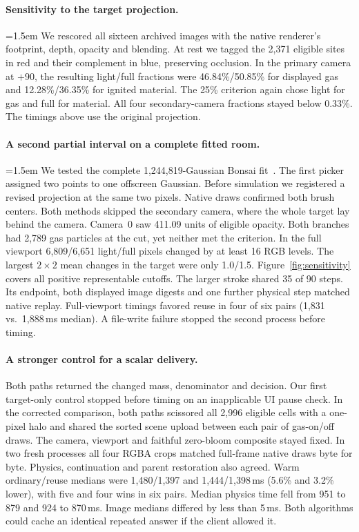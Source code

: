\documentclass[acmtog,anonymous,review]{acmart}
\begin{document}
\paragraph{Sensitivity to the target projection.}
\begingroup\emergencystretch=1.5em We rescored all sixteen archived images with the native renderer's footprint, depth, opacity and blending. At rest we tagged the 2,371 eligible sites in red and their complement in blue, preserving occlusion. In the primary camera at $+90$, the resulting light/full fractions were 46.84\%/50.85\% for displayed gas and 12.28\%/36.35\% for ignited material. The 25\% criterion again chose light for gas and full for material. All four secondary-camera fractions stayed below 0.33\%. The timings above use the original projection.\par\endgroup
\paragraph{A second partial interval on a complete fitted room.}
\begingroup\emergencystretch=1.5em We tested the complete 1,244,819-Gaussian Bonsai fit~\citep{kerbl2023,barron2022}. The first picker assigned two points to one offscreen Gaussian. Before simulation we registered a revised projection at the same two pixels. Native draws confirmed both brush centers. Both methods skipped the secondary camera, where the whole target lay behind the camera. Camera~0 saw 411.09 units of eligible opacity. Both branches had 2,789 gas particles at the cut, yet neither met the criterion. In the full viewport 6,809/6,651 light/full pixels changed by at least 16 RGB levels. The largest $2\times2$ mean changes in the target were only 1.0/1.5. Figure~\ref{fig:sensitivity} covers all positive representable cutoffs. The larger stroke shared 35 of 90 steps. Its endpoint, both displayed image digests and one further physical step matched native replay. Full-viewport timings favored reuse in four of six pairs (1,831 vs.\ 1,888\,ms median). A file-write failure stopped the second process before timing.\par\endgroup


\paragraph{A stronger control for a scalar delivery.}
Both paths returned the changed mass, denominator and decision. Our first target-only control stopped before timing on an inapplicable UI pause check. In the corrected comparison, both paths scissored all 2,996 eligible cells with a one-pixel halo and shared the sorted scene upload between each pair of gas-on/off draws. The camera, viewport and faithful zero-bloom composite stayed fixed. In two fresh processes all four RGBA crops matched full-frame native draws byte for byte. Physics, continuation and parent restoration also agreed. Warm ordinary/reuse medians were 1,480/1,397 and 1,444/1,398\,ms (5.6\% and 3.2\% lower), with five and four wins in six pairs. Median physics time fell from 951 to 879 and 924 to 870\,ms. Image medians differed by less than 5\,ms. Both algorithms could cache an identical repeated answer if the client allowed it.
\end{document}
